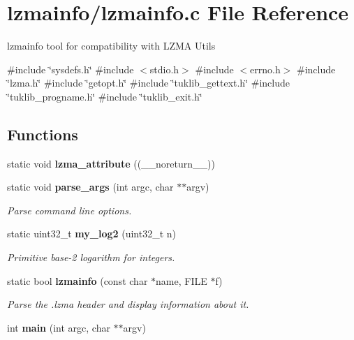 \section{lzmainfo/lzmainfo.c File Reference}
\label{lzmainfo_8c}


lzmainfo tool for compatibility with L\+Z\+MA Utils  


{\ttfamily \#include \char`\"{}sysdefs.\+h\char`\"{}}\newline
{\ttfamily \#include $<$stdio.\+h$>$}\newline
{\ttfamily \#include $<$errno.\+h$>$}\newline
{\ttfamily \#include \char`\"{}lzma.\+h\char`\"{}}\newline
{\ttfamily \#include \char`\"{}getopt.\+h\char`\"{}}\newline
{\ttfamily \#include \char`\"{}tuklib\+\_\+gettext.\+h\char`\"{}}\newline
{\ttfamily \#include \char`\"{}tuklib\+\_\+progname.\+h\char`\"{}}\newline
{\ttfamily \#include \char`\"{}tuklib\+\_\+exit.\+h\char`\"{}}\newline
\subsection*{Functions}
\begin{DoxyCompactItemize}
\item 
\mbox{\label{lzmainfo_8c_a1957d0c8f6ec2eb4950e67226425ee7c}} 
static void {\bfseries lzma\+\_\+attribute} ((\+\_\+\+\_\+noreturn\+\_\+\+\_\+))
\item 
static void \textbf{ parse\+\_\+args} (int argc, char $\ast$$\ast$argv)
\begin{DoxyCompactList}\small\item\em Parse command line options. \end{DoxyCompactList}\item 
static uint32\+\_\+t \textbf{ my\+\_\+log2} (uint32\+\_\+t n)
\begin{DoxyCompactList}\small\item\em Primitive base-\/2 logarithm for integers. \end{DoxyCompactList}\item 
static bool \textbf{ lzmainfo} (const char $\ast$name, F\+I\+LE $\ast$f)
\begin{DoxyCompactList}\small\item\em Parse the .lzma header and display information about it. \end{DoxyCompactList}\item 
\mbox{\label{lzmainfo_8c_a3c04138a5bfe5d72780bb7e82a18e627}} 
int {\bfseries main} (int argc, char $\ast$$\ast$argv)
\end{DoxyCompactItemize}


